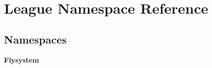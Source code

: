 \section{League Namespace Reference}
\label{namespace_league}
\subsection*{Namespaces}
\begin{DoxyCompactItemize}
\item 
 {\bf Flysystem}
\end{DoxyCompactItemize}

